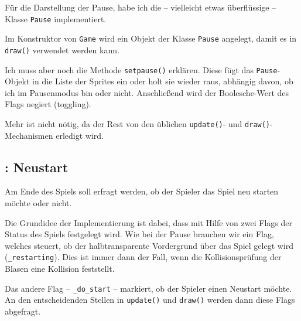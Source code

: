 
Für die Darstellung der Pause, habe ich die -- vielleicht etwas überflüssige -- Klasse \texttt{Pause} implementiert. 


Im Konstruktor von \texttt{Game} wird ein Objekt der Klasse \texttt{Pause} angelegt, damit es in \texttt{draw()} verwendet werden kann. 


Ich muss aber noch die Methode \texttt{setpause()} erklären. Diese fügt das \texttt{Pause}-Objekt in die Liste der Sprites ein oder holt sie wieder raus, abhängig davon, ob ich im Pausenmodus bin oder nicht. Anschließend wird der Boolesche-Wert des Flags negiert (\gls{toggling}).


Mehr ist nicht nötig, da der Rest von den üblichen \texttt{update()}- und \texttt{draw()}-Mechanismen erledigt wird.

\subsection{: Neustart}
 Am Ende des Spiels soll erfragt werden, ob der Spieler das Spiel neu starten möchte oder nicht.
\er

Die Grundidee der Implementierung ist dabei, dass mit Hilfe von zwei Flags der Status des Spiels festgelegt wird. Wie bei der Pause brauchen wir ein Flag, welches steuert, ob der halbtransparente Vordergrund über das Spiel gelegt wird (\texttt{\_restarting}). Dies ist immer dann der Fall, wenn die Kollisionsprüfung der Blasen eine Kollision feststellt. 

Das andere Flag -- \texttt{\_do\_start} -- markiert, ob der Spieler einen Neustart möchte. An den entscheidenden Stellen in \texttt{update()} und \texttt{draw()} werden dann diese Flags abgefragt.

